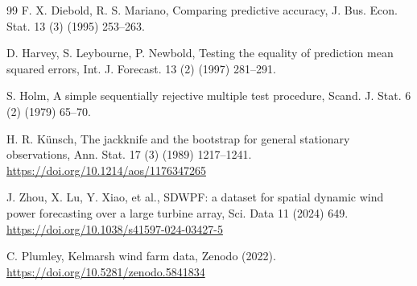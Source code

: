 \documentclass[review,3p,times]{elsarticle}
\begin{document}
\begin{thebibliography}{99}
F. X. Diebold, R. S. Mariano,
Comparing predictive accuracy,
J. Bus. Econ. Stat. 13 (3) (1995) 253--263.

D. Harvey, S. Leybourne, P. Newbold,
Testing the equality of prediction mean squared errors,
Int. J. Forecast. 13 (2) (1997) 281--291.

S. Holm,
A simple sequentially rejective multiple test procedure,
Scand. J. Stat. 6 (2) (1979) 65--70.

H. R. Künsch,
The jackknife and the bootstrap for general stationary observations,
Ann. Stat. 17 (3) (1989) 1217--1241.
\url{https://doi.org/10.1214/aos/1176347265}

J. Zhou, X. Lu, Y. Xiao, et al.,
SDWPF: a dataset for spatial dynamic wind power forecasting over a large
turbine array,
Sci. Data 11 (2024) 649.
\url{https://doi.org/10.1038/s41597-024-03427-5}

C. Plumley,
Kelmarsh wind farm data, Zenodo (2022).
\url{https://doi.org/10.5281/zenodo.5841834}

\end{thebibliography}
\end{document}
